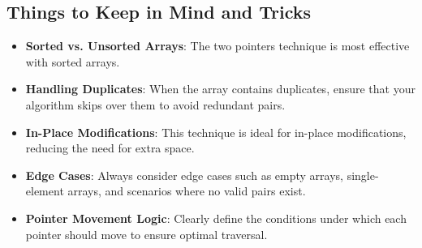 \subsection*{Things to Keep in Mind and Tricks}
\begin{itemize}
    \item \textbf{Sorted vs. Unsorted Arrays}: The two pointers technique is most effective with sorted arrays.
    \item \textbf{Handling Duplicates}: When the array contains duplicates, ensure that your algorithm skips over them to avoid redundant pairs.
    \item \textbf{In-Place Modifications}: This technique is ideal for in-place modifications, reducing the need for extra space.
    \item \textbf{Edge Cases}: Always consider edge cases such as empty arrays, single-element arrays, and scenarios where no valid pairs exist.
    \item \textbf{Pointer Movement Logic}: Clearly define the conditions under which each pointer should move to ensure optimal traversal.
\end{itemize}

